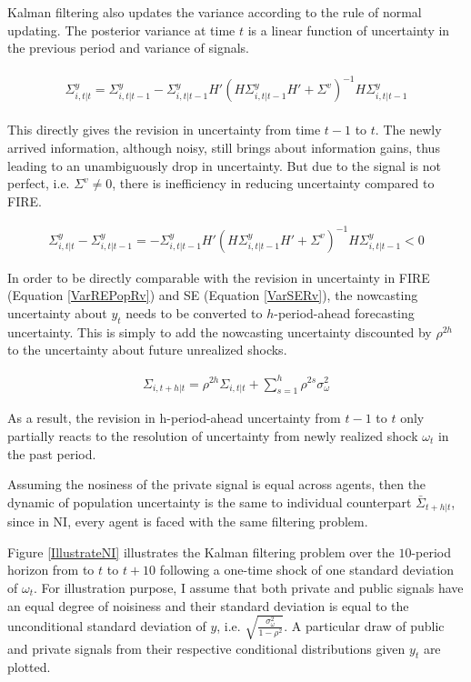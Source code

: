 \documentclass[12pt]{article}
\begin{document}
	Kalman filtering also updates the variance according to the rule of normal updating.   The posterior variance at time $t$ is a linear function of uncertainty in the previous period and variance of signals. 
	
	\begin{eqnarray}
		\begin{aligned}
			\Sigma^y_{i,t|t} = \Sigma^y_{i,t|t-1} - \Sigma^y_{i,t|t-1} H'{(H \Sigma^y_{i,t|t-1} H' +\Sigma^v)}^{-1} H \Sigma^y_{i,t|t-1} 
		\end{aligned}
	\end{eqnarray}
	
	This directly gives the revision in uncertainty from time $t-1$ to $t$. The newly arrived information, although noisy, still brings about information gains, thus leading to an unambiguously drop in uncertainty. But due to the signal is not perfect, i.e. $\Sigma^v \neq 0$, there is inefficiency in reducing uncertainty compared to FIRE. 
	
	\begin{eqnarray}\label{VarNIRv}
		\Sigma^y_{i,t|t} - \Sigma^y_{i,t|t-1} = - \Sigma^y_{i,t|t-1} H'{(H \Sigma^y_{i,t|t-1} H' +\Sigma^v)}^{-1} H \Sigma^y_{i,t|t-1} <0
	\end{eqnarray}
	
	In order to be directly comparable with the revision in uncertainty in FIRE (Equation \ref{VarREPopRv}) and SE (Equation \ref{VarSERv}), the nowcasting uncertainty about $y_t$ needs to be converted to $h$-period-ahead forecasting uncertainty. This is simply to add the nowcasting uncertainty discounted by $\rho^{2h}$ to the uncertainty about future unrealized shocks.   
	
	\begin{eqnarray}\label{VarNIEq}
		\Sigma_{i,t+h|t} = \rho^{2h} \Sigma_{i,t|t} + \sum^{h}_{s=1}\rho^{2s} \sigma^2_{\omega}
	\end{eqnarray}
	
	As a result, the revision in h-period-ahead uncertainty from $t-1$ to $t$ only partially reacts to the resolution of uncertainty from newly realized shock $\omega_t$ in the past period. 
	
	Assuming the nosiness of the private signal is equal across agents, then the dynamic of population uncertainty is the same to individual counterpart $\bar \Sigma_{t+h|t}$, since in NI, every agent is faced with the same filtering problem.  
	
	Figure \ref{IllustrateNI} illustrates the Kalman filtering problem over the $10$-period horizon from to $t$ to $t+10$  following a one-time shock of one standard deviation of $\omega_t$.  For illustration purpose, I assume that both private and public signals have an equal degree of noisiness and their standard deviation is equal to the unconditional standard deviation of $y$, i.e. $\sqrt{\frac{\sigma^2_\omega}{1-\rho^2}}$.  A particular draw of public and private signals from their respective conditional distributions given $y_t$ are plotted.    
	
\end{document}
